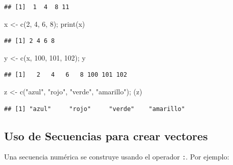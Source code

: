 \documentclass[
]{book}
\newenvironment{Shaded}{\begin{snugshade}}{\end{snugshade}}
\newcommand{\DecValTok}[1]{\textcolor[rgb]{0.00,0.00,0.81}{#1}}
\newcommand{\FunctionTok}[1]{\textcolor[rgb]{0.00,0.00,0.00}{#1}}
\newcommand{\NormalTok}[1]{#1}
\newcommand{\OtherTok}[1]{\textcolor[rgb]{0.56,0.35,0.01}{#1}}
\newcommand{\StringTok}[1]{\textcolor[rgb]{0.31,0.60,0.02}{#1}}
\begin{document}
\begin{verbatim}
## [1]  1  4  8 11
\end{verbatim}

\begin{Shaded}
\begin{Highlighting}[]
\NormalTok{x }\OtherTok{\textless{}{-}} \FunctionTok{c}\NormalTok{(}\DecValTok{2}\NormalTok{, }\DecValTok{4}\NormalTok{, }\DecValTok{6}\NormalTok{, }\DecValTok{8}\NormalTok{); }\FunctionTok{print}\NormalTok{(x) }
\end{Highlighting}
\end{Shaded}

\begin{verbatim}
## [1] 2 4 6 8
\end{verbatim}

\begin{Shaded}
\begin{Highlighting}[]
\NormalTok{y }\OtherTok{\textless{}{-}} \FunctionTok{c}\NormalTok{(x, }\DecValTok{100}\NormalTok{, }\DecValTok{101}\NormalTok{, }\DecValTok{102}\NormalTok{); y}
\end{Highlighting}
\end{Shaded}

\begin{verbatim}
## [1]   2   4   6   8 100 101 102
\end{verbatim}

\begin{Shaded}
\begin{Highlighting}[]
\NormalTok{z }\OtherTok{\textless{}{-}} \FunctionTok{c}\NormalTok{(}\StringTok{"azul"}\NormalTok{, }\StringTok{"rojo"}\NormalTok{, }\StringTok{"verde"}\NormalTok{, }\StringTok{"amarillo"}\NormalTok{); (z)}
\end{Highlighting}
\end{Shaded}

\begin{verbatim}
## [1] "azul"     "rojo"     "verde"    "amarillo"
\end{verbatim}

\hypertarget{uso-sec}{%
\subsection{\texorpdfstring{Uso de \textbf{Secuencias} para crear vectores}{Uso de Secuencias para crear vectores}}\label{uso-sec}}

Una secuencia numérica se construye usando el operador \index{:}\texttt{:}. Por ejemplo:
\end{document}
